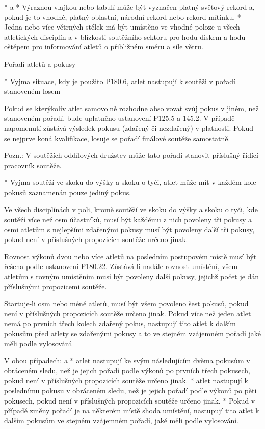 * \begitems \style a
  * Výraznou vlajkou nebo tabulí může být vyznačen platný světový rekord a, pokud je to vhodné, platný oblastní, národní rekord nebo rekord mítinku.
  * Jedna nebo více větrných stélek má být umístěno ve vhodné poloze u všech atletických disciplín a v blízkosti soutěžního sektoru pro hodu diskem a hodu oštěpem pro informování atletů o přibližném směru a síle větru.
  \enditems

Pořadí atletů a pokusy

* Vyjma situace, kdy je použito P180.6, atlet nastupují k soutěži v pořadí stanoveném losem

Pokud se kterýkoliv atlet samovolně rozhodne absolvovat svůj pokus v jiném, než stanoveném pořadí, bude uplatněno ustanovení P125.5 a 145.2. V případě napomenutí zůstává výsledek pokusu (zdařený či nezdařený) v platnosti. Pokud se nejprve koná kvalifikace, losuje se pořadí finálové soutěže samostatně.

Pozn.: V soutěžích oddílových družstev může tato pořadí stanovit příslušný řídící pracovník soutěže.

* Vyjma soutěží ve skoku do výšky a skoku o tyči, atlet může mít v každém kole pokusů zaznamenán pouze jediný pokus.

Ve všech disciplínách v poli, kromě soutěží ve skoku do výšky a skoku o tyči, kde soutěží více než osm účastníků, musí být každému z nich povoleny tři pokusy a osmi atletům s nejlepšími zdařenými pokusy musí být povoleny další tři pokusy, pokud není v příslušných propozicích soutěže určeno jinak.

Rovnost výkonů dvou nebo více atletů na posledním postupovém místě musí být řešena podle ustanovení P180.22. Zůstává-li nadále rovnost umístění, všem atletům s rovným umístěním musí být povoleny další pokusy, jejichž počet je dán příslušnými propozicemi soutěže.

Startuje-li osm nebo méně atletů, musí být všem povoleno šest pokusů, pokud není v příslušných propozicích soutěže určeno jinak.  Pokud více než jeden atlet nemá po prvních třech kolech zdařený pokus, nastupují tito atlet k dalším pokusům před atlety se zdařenými pokusy a to ve stejném vzájemném pořadí jaké měli podle vylosování.

V obou případech:
  \begitems \style a
  * atlet nastupují ke svým následujícím dvěma pokusům v obráceném sledu, než je jejich pořadí podle výkonů po prvních třech pokusech, pokud není v příslušných propozicích soutěže určeno jinak.
  * atlet nastupují k poslednímu pokusu v obráceném sledu, než je jejich pořadí podle výkonů po pěti pokusech, pokud není v příslušných propozicích soutěže určeno jinak.
  * Pokud v případě změny pořadí je na některém místě shoda umístění, nastupují tito atlet k dalším pokusům ve stejném vzájemném pořadí, jaké měli podle vylosování.
  \enditems

